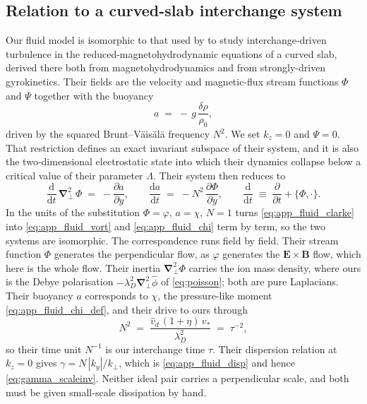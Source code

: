 \documentclass{jpp}
\newcommand{\rmd}{\text{d}}
\renewcommand{\vec}[1]{\boldsymbol{#1}}
\newcommand{\vec}[1]{\boldsymbol{#1}}
\newcommand{\grad}{{\vec{\nabla}}}
\newcommand{\kperp}{k_\perp}
\newcommand{\pbrainline}[2]{\lbrace #1, #2 \rbrace}
\newcommand{\vE}{\vec{E}}
\newcommand{\vB}{\vec{B}}
\newcommand{\lambdaD}{\lambda_D}
\begin{document}
\subsection{Relation to a curved-slab interchange system}\label{sec:app_fluid_clarke_sec}

Our fluid model is isomorphic to that used by \citet{ClarkeUnpub} to study interchange-driven turbulence in the reduced-magnetohydrodynamic equations of a curved slab, derived there both from magnetohydrodynamics and from strongly-driven gyrokinetics. Their fields are the velocity and magnetic-flux stream functions $\Phi$ and $\Psi$ together with the buoyancy
\begin{equation}\label{eq:app_fluid_buoyancy}
a \;=\; -\,g\,\frac{\delta\rho}{\rho_0} ,
\end{equation}
driven by the squared Brunt--V\"ais\"al\"a frequency $N^2$. We set $k_z = 0$ and $\Psi = 0$. That restriction defines an exact invariant subspace of their system, and it is also the two-dimensional electrostatic state into which their dynamics collapse below a critical value of their parameter $\Lambda$. Their system then reduces to
\begin{equation}\label{eq:app_fluid_clarke}
\frac{\rmd}{\rmd t}\,\grad_\perp^2\,\Phi \;=\; -\frac{\partial a}{\partial y},
\qquad
\frac{\rmd a}{\rmd t} \;=\; -N^2\,\frac{\partial \Phi}{\partial y},
\qquad
\frac{\rmd}{\rmd t} \;\equiv\; \frac{\partial}{\partial t} + \pbrainline{\Phi}{\cdot}.
\end{equation}
In the units of  the substitution $\Phi = \varphi$, $a = \chi$, $N = 1$ turns \cref{eq:app_fluid_clarke} into \cref{eq:app_fluid_vort} and \cref{eq:app_fluid_chi} term by term, so the two systems are isomorphic. The correspondence runs field by field. Their stream function $\Phi$ generates the perpendicular flow, as $\varphi$ generates the $\vE\times\vB$ flow, which here is the whole flow. Their inertia $\grad_\perp^2\Phi$ carries the ion mass density, where ours is the Debye polarisation $-\lambdaD^2\grad_\perp^2\hat\phi$ of \cref{eq:poisson}; both are pure Laplacians. Their buoyancy $a$ corresponds to $\chi$, the pressure-like moment \cref{eq:app_fluid_chi_def}, and their drive to ours through
\begin{equation}\label{eq:app_fluid_N2}
N^2 \;=\; \frac{\hat{v}_d\,(1+\eta)\,v_*}{\lambdaD^2} \;=\; \tau^{-2} ,
\end{equation}
so their time unit $N^{-1}$ is our interchange time $\tau$. Their dispersion relation at $k_z = 0$ gives $\gamma = N\,|k_y|/\kperp$, which is \cref{eq:app_fluid_disp} and hence \cref{eq:gamma_scaleinv}. Neither ideal pair carries a perpendicular scale, and both must be given small-scale dissipation by hand.
\end{document}
